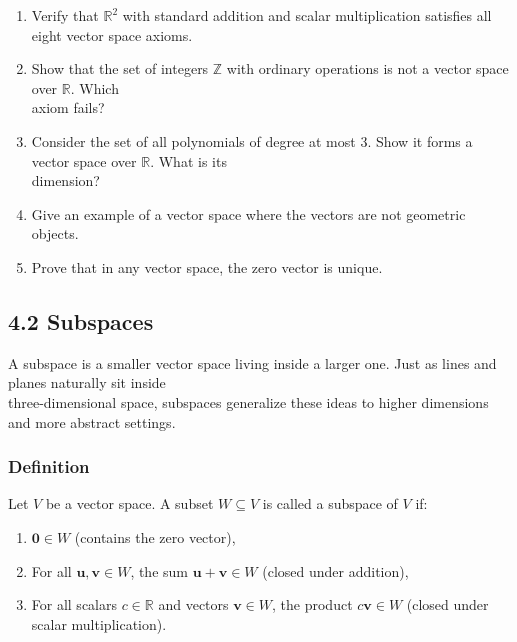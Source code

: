 \documentclass[
  12pt,
  a4paper,
]{article}
\begin{document}
\begin{enumerate}
\def\labelenumi{\arabic{enumi}.}
\item
  Verify that \(\mathbb{R}^2\) with standard addition and scalar
  multiplication satisfies all eight vector space axioms.
\item
  Show that the set of integers \(\mathbb{Z}\) with ordinary operations
  is not a vector space over \(\mathbb{R}\). Which\\
  axiom fails?
\item
  Consider the set of all polynomials of degree at most 3. Show it forms
  a vector space over \(\mathbb{R}\). What is its\\
  dimension?
\item
  Give an example of a vector space where the vectors are not geometric
  objects.
\item
  Prove that in any vector space, the zero vector is unique.
\end{enumerate}

\subsection{4.2 Subspaces}\label{42-subspaces}

A subspace is a smaller vector space living inside a larger one. Just as
lines and planes naturally sit inside\\
three-dimensional space, subspaces generalize these ideas to higher
dimensions and more abstract settings.

\subsubsection{Definition}\label{definition-2}

Let \(V\) be a vector space. A subset \(W \subseteq V\) is called a
subspace of \(V\) if:

\begin{enumerate}
\def\labelenumi{\arabic{enumi}.}
\item
  \(\mathbf{0} \in W\) (contains the zero vector),
\item
  For all \(\mathbf{u}, \mathbf{v} \in W\), the sum
  \(\mathbf{u} + \mathbf{v} \in W\) (closed under addition),
\item
  For all scalars \(c \in \mathbb{R}\) and vectors \(\mathbf{v} \in W\),
  the product \(c\mathbf{v} \in W\) (closed under\\
  scalar multiplication).
\end{enumerate}
\end{document}
